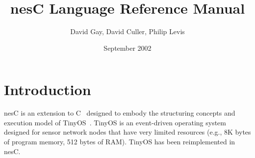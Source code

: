 \documentclass[11pt]{article}
\newcommand{\nesc}{nesC\xspace}
\begin{document}
\title{\nesc Language Reference Manual}
\author{David Gay, David Culler, Philip Levis}
\date{September 2002}

\maketitle

\section{Introduction}

\nesc is an extension to C~\cite{kandr} designed to embody the structuring
concepts and execution model of TinyOS~\cite{tinyos}. TinyOS is an
event-driven operating system designed for sensor network nodes that have
very limited resources (e.g., 8K bytes of program memory, 512 bytes of
RAM). TinyOS has been reimplemented in \nesc.
\end{document}

